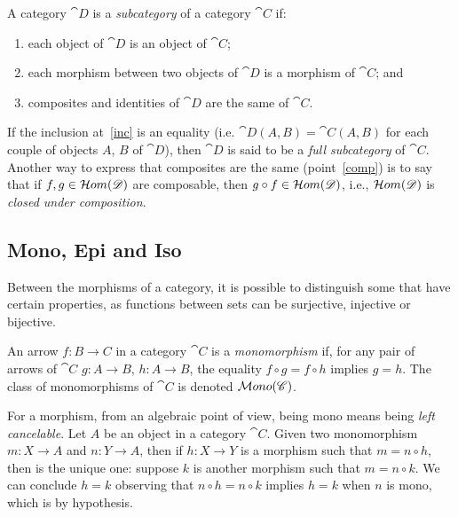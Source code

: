 \begin{definition}[Subcategory]
    A category $\cat{D}$ is a \emph{subcategory} of a category $\cat{C}$ if:
    \begin{enumerate}
        \item each object of $\cat{D}$ is an object of $\cat{C}$;
        \item \label{inc} each morphism between two objects of $\cat{D}$ is a morphism of $\cat{C}$; and
        \item \label{comp} composites and identities of $\cat{D}$ are the same of $\cat{C}$.
    \end{enumerate}

    If the inclusion at~\ref{inc} is an equality (i.e. $\cat{D}(A, B) = \cat{C}(A, B)$ for each couple of objects $A$, $B$ of $\cat{D}$), then $\cat{D}$ is said to be a \emph{full subcategory} of $\cat{C}$.
    Another way to express that composites are the same (point~\ref{comp}) is to say that if $f, g \in \mathcal{H}om(\mathscr{D})$ are composable, then $g \circ f \in \mathcal{H}om(\mathscr{D})$, i.e., $\mathcal{H}om(\mathscr{D})$ is \emph{closed under composition}.
\end{definition}


\subsection{Mono, Epi and Iso}\label{ssect:Mono_epi_iso}

Between the morphisms of a category, it is possible to distinguish some that have certain properties, as functions between sets can be surjective, injective or bijective.

\begin{definition}[Monomorphism]\label{def:mono}
    An arrow $f:B\rightarrow C$ in a category $\cat{C}$ is a \emph{monomorphism} if, for any pair of arrows of $\cat{C}$ $g:A \rightarrow B$, $h: A \rightarrow B$, the equality $f \circ g = f \circ h$ implies $g = h$. The class of monomorphisms of $\cat C$ is denoted $\mathcal{M}ono(\mathscr{C})$.
\end{definition}

\begin{remark}\label{rem:fact_of_subobject_is_unique}
    For a morphism, from an algebraic point of view, being mono means being \emph{left cancelable}.
    Let $A$ be an object in a category $\cat C$. Given two monomorphism $m: X \to A$ and $n: Y \to A$, then if  $h: X \to Y$ is a morphism such that $m = n \circ h$, then is the unique one: suppose $k$ is another morphism such that $m = n \circ k$. We can conclude $h = k$ observing that $n \circ h = n \circ k$ implies $h = k$ when $n$ is mono, which is by hypothesis.    
\end{remark}


